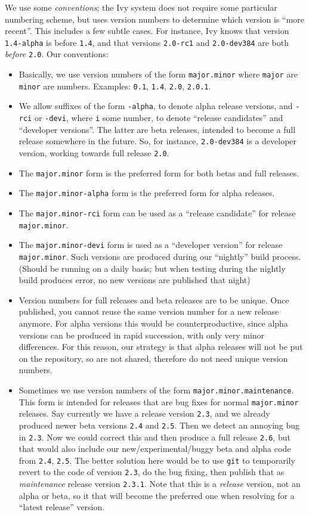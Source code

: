 We use some \emph{conventions}; the Ivy system does not require some particular numbering scheme, but
uses version numbers to determine which version is ``more recent''.
This includes a few subtle cases. For instance, Ivy knows that version \verb"1.4-alpha" is before
\verb"1.4", and that versions \verb"2.0-rc1" and \verb"2.0-dev384" are both \emph{before} \verb"2.0".
Our conventions:
\begin{itemize}
\item Basically, we use version numbers of the form \verb"major.minor"
where \verb"major" are  \verb"minor" are numbers.
Examples: \verb"0.1", \verb"1.4", \verb"2.0", \verb"2.0.1".
\item We allow suffixes of the form \verb"-alpha", to denote alpha release versions,
and \verb"-rci" or \verb"-devi", where \verb"i" some number, to denote ``release candidates'' and ``developer versions''.
The latter are beta releases, intended to become a full release somewhere in the future. So, for instance, \verb"2.0-dev384"
is a developer version, working towards full release \verb"2.0". 
\item The \verb"major.minor" form is the preferred form for both betas and full releases.
\item The \verb"major.minor-alpha" form is the preferred form for alpha releases.
\item The \verb"major.minor-rci" form can be used as a ``release candidate'' for release \verb"major.minor".
\item The \verb"major.minor-devi" form is used as a ``developer version'' for release \verb"major.minor".
Such versions are produced during our ``nightly'' build process. (Should be running on a daily basis; but when testing during
the nightly build produces error, no new versions are published that night)
\item Version numbers for full releases and beta releases are to be unique.
Once published, you cannot reuse the same version number for a new release anymore.
For alpha versions this would be counterproductive, since alpha versions can be produced in rapid succession,
with only very minor differences. For this reason, our strategy is that alpha releases will not be put on
the repository, so are not shared, therefore do not need unique version numbers.
\item Sometimes we use version numbers of the form \verb"major.minor.maintenance".
This form is intended for releases that are bug fixes for normal \verb"major.minor" releases.
Say currently we have a release version \verb"2.3", and we already produced newer beta versions
\verb"2.4" and \verb"2.5".
Then we detect an annoying bug in \verb"2.3". Now we could correct this and then produce
 a full release \verb"2.6", but that would also include our new/experimental/buggy beta and alpha code from \verb"2.4", \verb"2.5".
  The better solution here would be to use \verb"git" to temporarily revert
to the code of version \verb"2.3", do the bug fixing, then publish that as
\emph{maintenance} release version \verb"2.3.1".
Note that this is a \emph{release} version, not an alpha or beta, so it that will become the preferred one when resolving 
 for a ``latest release'' version.
\end{itemize}
